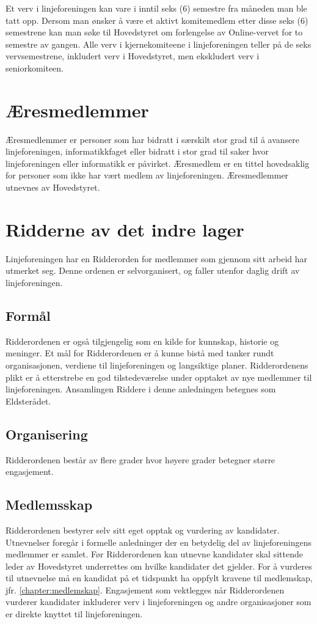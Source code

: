 Et verv i linjeforeningen kan vare i inntil seks (6) semestre fra måneden man ble tatt opp. Dersom man ønsker å være et aktivt komitemedlem etter disse seks (6) semestrene kan man søke til Hovedstyret om forlengelse av Online-vervet for to semestre av gangen. Alle verv i kjernekomiteene i linjeforeningen teller på de seks vervsemestrene, inkludert verv i Hovedstyret, men ekskludert verv i seniorkomiteen.


\section{Æresmedlemmer}
\vspace{23pt}

Æresmedlemmer er personer som har bidratt i særskilt stor grad til å avansere linjeforeningen, informatikkfaget eller bidratt i stor grad til saker hvor linjeforeningen eller informatikk er påvirket.
Æresmedlem er en tittel hovedsaklig for personer som ikke har vært medlem av linjeforeningen.
Æresmedlemmer utnevnes av Hovedstyret.

\section{Ridderne av det indre lager}
\vspace{23pt}

Linjeforeningen har en Ridderorden for medlemmer som gjennom sitt arbeid har utmerket seg. Denne ordenen er selvorganisert, og faller utenfor daglig drift av linjeforeningen.

\subsection{Formål}
Ridderordenen er også tilgjengelig som en kilde for kunnskap, historie og meninger. Et mål for Ridderordenen er å kunne bistå med tanker rundt organisasjonen, verdiene til linjeforeningen og langsiktige planer.
Ridderordenens plikt er å etterstrebe en god tilstedeværelse under opptaket av nye medlemmer til linjeforeningen. Ansamlingen Riddere i denne anledningen betegnes som Eldsterådet.


\subsection{Organisering}{
Ridderordenen består av flere grader hvor høyere grader betegner større engasjement.
}

\subsection{Medlemsskap}{
Ridderordenen bestyrer selv sitt eget opptak og vurdering av kandidater. Utnevnelser foregår i formelle anledninger der en betydelig del av linjeforeningens medlemmer er samlet. Før Ridderordenen kan utnevne kandidater skal sittende leder av Hovedstyret underrettes om hvilke kandidater det gjelder. For å vurderes til utnevnelse må en kandidat på et tidspunkt ha oppfylt kravene til medlemskap, jfr. \ref{chapter:medlemskap}. Engasjement som vektlegges når Ridderordenen vurderer kandidater inkluderer verv i linjeforeningen og andre organisasjoner som er direkte knyttet til linjeforeningen.
}
